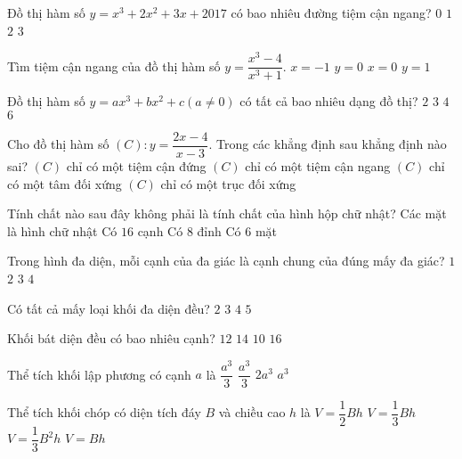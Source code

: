 \begin{ex}%
	Đồ thị hàm số $y=x^3+2x^2+3x+2017$ có bao nhiêu đường tiệm cận ngang?
	\choice
	{\True $0$}
	{$1$}
	{$2$}
	{$3$}
\end{ex}
\begin{ex}%
	Tìm tiệm cận ngang của đồ thị hàm số $y= \dfrac{x^3-4}{x^3+1}$.
	\choice
	{$x=-1$}
	{$y=0 $}
	{$x=0$}
	{\True$y=1$}
\end{ex}
\begin{ex}%
	Đồ thị hàm số $y=ax^3+bx^2+c \left(a \ne 0 \right)$ có tất cả bao nhiêu dạng đồ thị?
	\choice
	{$2$}
	{$3$}
	{\True $4$}
	{$6$}
\end{ex}
\begin{ex}%
	Cho đồ thị hàm số $(C):y= \dfrac{2x-4}{x-3}$. Trong các khẳng định sau khẳng định nào sai?
	\choice
	{$(C)$ chỉ có một tiệm cận đứng}
	{$(C)$ chỉ có một tiệm cận ngang}						
	{$(C)$ chỉ có một tâm đối xứng}
	{\True $(C)$ chỉ có một trục đối xứng}
\end{ex}
\begin{ex}%
	Tính chất nào sau đây không phải là tính chất của hình hộp chữ nhật?
	\choice
	{Các mặt là hình chữ nhật}
	{\True Có $16$ cạnh}
	{Có $8$ đỉnh}
	{Có 6 mặt}
\end{ex}
\begin{ex}%
	Trong hình đa diện, mỗi cạnh của đa giác là cạnh chung của đúng mấy đa giác?
	\choice
	{$1	$}
	{\True $2$}
	{$3$}
	{$4$}
\end{ex}
\begin{ex}%
	Có tất cả mấy loại khối đa diện đều?
	\choice
	{$2$}
	{$3$}
	{$4$}
	{\True $5$}
\end{ex}
\begin{ex}%
	Khối bát diện đều có bao nhiêu cạnh?
	\choice
	{\True $12$}
	{$14$}
	{$10$}
	{$16$}
\end{ex}
\begin{ex}%
	Thể tích khối lập phương có cạnh $a$ là 
	\choice
	{ $ \dfrac{a^3}3$}
	{$\dfrac{a^3}3$}
	{ $2a^3$}
	{\True $a^3$}
\end{ex}
\begin{ex}%
	Thể tích khối chóp có diện tích đáy $B$ và chiều cao $h$ là
	\choice
	{ $V= \dfrac{1}{2}Bh$}
	{\True $V= \dfrac{1}{3}Bh$}
	{ $V= \dfrac{1}{3}B^2h$}
	{$V=Bh$}
\end{ex}

